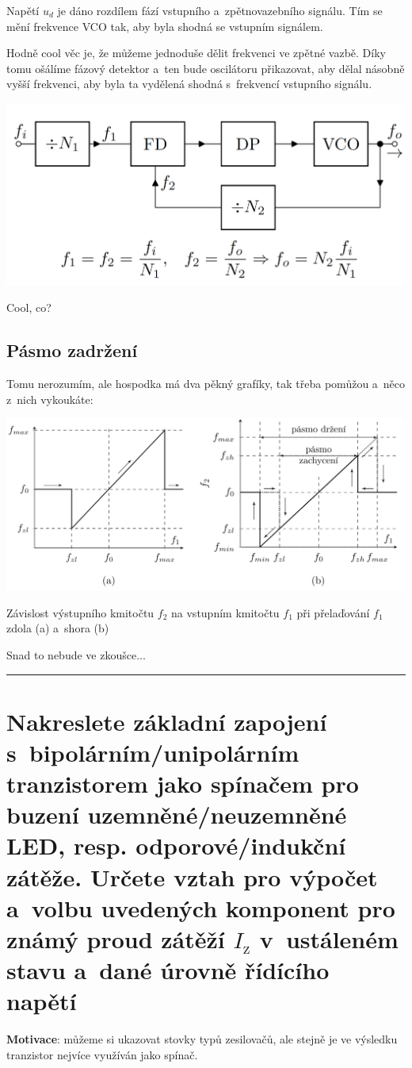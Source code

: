\documentclass[a4paper,12pt]{article}   %
\begin{document}
Napětí $u_d$ je dáno rozdílem fází vstupního a~zpětnovazebního signálu. Tím se mění frekvence VCO tak, aby byla shodná se vstupním signálem.

Hodně cool věc je, že můžeme jednoduše dělit frekvenci ve zpětné vazbě. Díky tomu ošálíme fázový detektor a~ten bude oscilátoru přikazovat, aby dělal násobně vyšší frekvenci, aby byla ta vydělená shodná s~frekvencí vstupního signálu.

\begin{graf}[h!]
    \centering
    \includegraphics[width = .6\textwidth]{fazovy_zaves-deleni.PNG}
\end{graf}
Cool, co?

\subsection*{Pásmo zadržení}
Tomu nerozumím, ale hospodka má dva pěkný grafíky, tak třeba pomůžou a~něco z~nich vykoukáte:
\begin{graf}[h!]
    \centering
    \includegraphics[width=\textwidth]{pasmo_zadrzeni.PNG}
    \caption{Závislost výstupního kmitočtu $f_2$ na vstupním kmitočtu $f_1$ při přelaďování $f_1$ zdola (a) a~shora (b)}
    \label{graf:pasmo:zadrzeni}
\end{graf}

Snad to nebude ve zkoušce...
 \\






\hrule%
\section{Nakreslete základní zapojení s~bipolárním/unipolárním tranzistorem jako spínačem pro buzení uzemněné/neuzemněné LED, resp. odporové/indukční zátěže. Určete vztah pro výpočet a~volbu uvedených komponent pro známý proud zátěží $I_\text{z}$ v~ustáleném stavu a~dané úrovně řídícího napětí}
\textbf{Motivace}: můžeme si ukazovat stovky typů zesilovačů, ale stejně je ve výsledku tranzistor nejvíce využíván jako spínač. 
\end{document}

